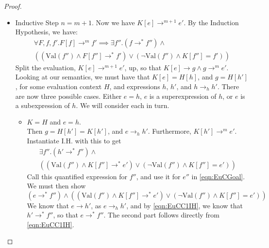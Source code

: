 \documentclass[twoside,11pt,openright]{report}
\theoremstyle{definition}
\newcommand{\expr}{e}
\newcommand{\elctx}{K}
\newcommand{\step}{\rightarrow}
\newcommand{\stepS}{\rightarrow^*}
\newcommand{\hstep}{\rightarrow_h}
\newcommand{\Val}[1]{\mathrm{Val}(#1)}
\begin{document}
\begin{proof}
\begin{itemize}
    \item Inductive Step $n = m + 1$. Now we have $\elctx[\expr] \step^{m + 1} \expr'$. By the Induction Hypothesis, we have:
    \begin{multline}\label{eqn:EuCIH}
      \forall F, f, f'. F[f] \step^m f' \implies \exists f'' . (f \stepS f'') \land \\
      \left( (\Val{f''} \land F[f''] \stepS f') \lor
      (\neg \Val{f''} \land \elctx[f''] = f') \right)
    \end{multline}
    Split the evaluation, $\elctx[\expr] \step^{m + 1} \expr'$, up, so that 
    $\elctx[\expr] \step g \land g \step^{m} \expr'$. Looking at our semantics, we must have that $\elctx[\expr] = H[h]$, and $g = H[h']$, for some evaluation context $H$, and expressions $h$, $h'$, and $h \hstep h'$.
    There are now three possible cases. Either $\expr = h$, $\expr$ is a superexpression of $h$, or $\expr$ is a subexpression of $h$. We will consider each in turn.
    \begin{itemize}
      \item $\elctx = H$ and $\expr = h$.\\
        Then $g = H[h'] = \elctx[h']$, and $\expr \hstep h'$. 
        Furthermore, $\elctx[h'] \step^m \expr'$. Instantiate I.H. with this to get
        \begin{multline}\label{eqn:EuCC1IH}
          \exists f'' . (h' \stepS f'') \land\\
          \left((\Val{f''} \land \elctx[f''] \stepS \expr') \lor
          (\neg \Val{f''} \land \elctx[f''] = \expr') \right)
        \end{multline}
        Call this quantified expression for $f''$, and use it for $\expr''$ in \ref{eqn:EuCGoal}. We must then show
        \begin{equation*}
          (\expr \stepS f'') \land 
          \left( (\Val{f''} \land \elctx[f''] \stepS \expr') \lor
          (\neg \Val{f''} \land \elctx[f''] = \expr') \right)
        \end{equation*}
        We know that $\expr \step h'$, as $\expr \hstep h'$, and by 
        \ref{eqn:EuCC1IH}, we know that $h' \stepS f''$, so that $\expr \stepS f''$. The second part follows directly from \ref{eqn:EuCC1IH}.
      

\end{itemize}
\end{itemize}
\end{proof}
\end{document}
